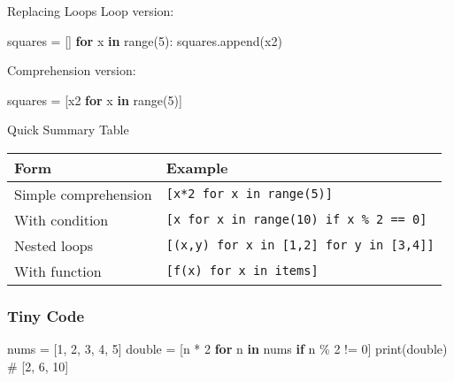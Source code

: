 \documentclass[
  letterpaper,
  DIV=11,
  numbers=noendperiod]{scrreprt}
\newenvironment{Shaded}{\begin{snugshade}}{\end{snugshade}}
\newcommand{\BuiltInTok}[1]{\textcolor[rgb]{0.00,0.23,0.31}{#1}}
\newcommand{\CommentTok}[1]{\textcolor[rgb]{0.37,0.37,0.37}{#1}}
\newcommand{\ControlFlowTok}[1]{\textcolor[rgb]{0.00,0.23,0.31}{\textbf{#1}}}
\newcommand{\DecValTok}[1]{\textcolor[rgb]{0.68,0.00,0.00}{#1}}
\newcommand{\KeywordTok}[1]{\textcolor[rgb]{0.00,0.23,0.31}{\textbf{#1}}}
\newcommand{\NormalTok}[1]{\textcolor[rgb]{0.00,0.23,0.31}{#1}}
\newcommand{\OperatorTok}[1]{\textcolor[rgb]{0.37,0.37,0.37}{#1}}
\begin{document}
Replacing Loops Loop version:

\begin{Shaded}
\begin{Highlighting}[]
\NormalTok{squares }\OperatorTok{=}\NormalTok{ []}
\ControlFlowTok{for}\NormalTok{ x }\KeywordTok{in} \BuiltInTok{range}\NormalTok{(}\DecValTok{5}\NormalTok{):}
\NormalTok{    squares.append(x2)}
\end{Highlighting}
\end{Shaded}

Comprehension version:

\begin{Shaded}
\begin{Highlighting}[]
\NormalTok{squares }\OperatorTok{=}\NormalTok{ [x2 }\ControlFlowTok{for}\NormalTok{ x }\KeywordTok{in} \BuiltInTok{range}\NormalTok{(}\DecValTok{5}\NormalTok{)]}
\end{Highlighting}
\end{Shaded}

Quick Summary Table

\begin{longtable}[]{@{}ll@{}}
\toprule\noalign{}
Form & Example \\
\midrule\noalign{}
\endhead
\bottomrule\noalign{}
\endlastfoot
Simple comprehension & \texttt{{[}x*2\ for\ x\ in\ range(5){]}} \\
With condition &
\texttt{{[}x\ for\ x\ in\ range(10)\ if\ x\ \%\ 2\ ==\ 0{]}} \\
Nested loops &
\texttt{{[}(x,y)\ for\ x\ in\ {[}1,2{]}\ for\ y\ in\ {[}3,4{]}{]}} \\
With function & \texttt{{[}f(x)\ for\ x\ in\ items{]}} \\
\end{longtable}

\subsubsection{Tiny Code}\label{tiny-code-80}

\begin{Shaded}
\begin{Highlighting}[]
\NormalTok{nums }\OperatorTok{=}\NormalTok{ [}\DecValTok{1}\NormalTok{, }\DecValTok{2}\NormalTok{, }\DecValTok{3}\NormalTok{, }\DecValTok{4}\NormalTok{, }\DecValTok{5}\NormalTok{]}
\NormalTok{double }\OperatorTok{=}\NormalTok{ [n }\OperatorTok{*} \DecValTok{2} \ControlFlowTok{for}\NormalTok{ n }\KeywordTok{in}\NormalTok{ nums }\ControlFlowTok{if}\NormalTok{ n }\OperatorTok{\%} \DecValTok{2} \OperatorTok{!=} \DecValTok{0}\NormalTok{]}
\BuiltInTok{print}\NormalTok{(double)   }\CommentTok{\# [2, 6, 10]}
\end{Highlighting}
\end{Shaded}
\end{document}
